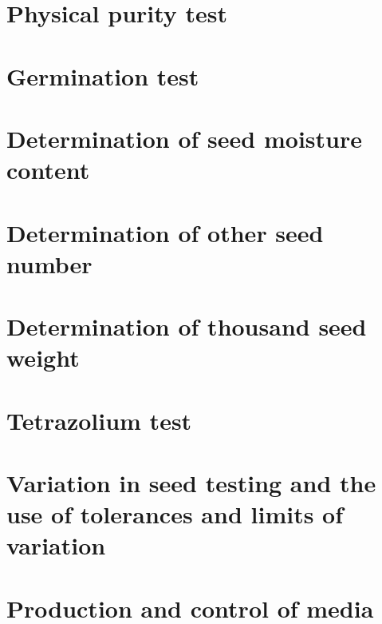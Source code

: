 \documentclass[
]{book}
\begin{document}
\hypertarget{physical-purity-test}{%
\chapter{Physical purity test}\label{physical-purity-test}}

\hypertarget{germination-test}{%
\chapter{Germination test}\label{germination-test}}

\hypertarget{determination-of-seed-moisture-content}{%
\chapter{Determination of seed moisture content}\label{determination-of-seed-moisture-content}}

\hypertarget{determination-of-other-seed-number}{%
\chapter{Determination of other seed number}\label{determination-of-other-seed-number}}

\hypertarget{determination-of-thousand-seed-weight}{%
\chapter{Determination of thousand seed weight}\label{determination-of-thousand-seed-weight}}

\hypertarget{tetrazolium-test}{%
\chapter{Tetrazolium test}\label{tetrazolium-test}}

\hypertarget{variation-in-seed-testing-and-the-use-of-tolerances-and-limits-of-variation}{%
\chapter{Variation in seed testing and the use of tolerances and limits of variation}\label{variation-in-seed-testing-and-the-use-of-tolerances-and-limits-of-variation}}

\hypertarget{production-and-control-of-media}{%
\chapter{Production and control of media}\label{production-and-control-of-media}}
\end{document}
